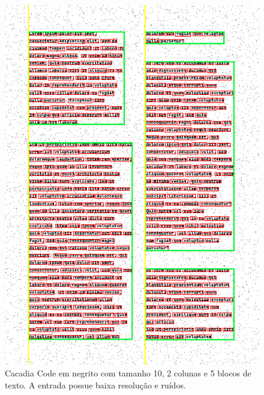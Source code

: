 \documentclass[english, 
               brazil, 
               bsc] %
               {dcomp-abntex2}
\begin{document}
\begin{figure}[h]
        \caption{\label{cascadia} \small Cacadia Code em negrito com tamanho 10, 2 colunas e 5 blocos de texto. A entrada possue baixa resolução e ruídos. }
        \begin{center}
            \includegraphics[scale=0.5]{./images/cascadia_code_10_detected_colunas_2_blocos_5_linhas_42_palavras_395.png}
        \end{center}
\end{figure}
\end{document}
